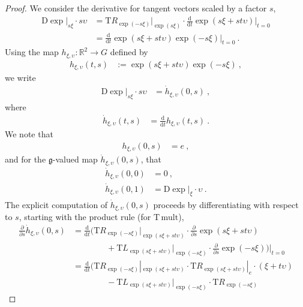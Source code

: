 \documentclass[10pt,a4paper]{article}
\theoremstyle{mytheorem}
\theoremstyle{mydefinition}
\newcommand{\dt}{\mathrm{d}}
\newcommand{\Dt}{\mathrm{D}}
\newcommand{\Tt}{\mathrm{T}}
\newcommand{\fg}{\mathfrak{g}}
\begin{document}
\begin{proof}
We consider the derivative for tangent vectors scaled by a factor $s$,
\begin{align*}
	\Dt\exp|_{s\xi} \cdot s\upsilon
	&=
	\Tt R_{\exp(-s\xi)}|_{\exp(s\xi)}
	\cdot
	\frac{\dt}{\dt t}
		\exp(s\xi + st\upsilon)
	\Big|_{t=0}
	\nonumber\\
	&=
	\frac{\dt}{\dt t}
		\exp(s\xi + st\upsilon)
		\exp(-s\xi)
	\Big|_{t=0}
	\ .
\end{align*}
Using the map $h_{\xi,\upsilon}:\mathbb{R}^2\rightarrow G$ defined by
\begin{align*}
	h_{\xi,\upsilon}(t, s)
	&:= 
	\exp(s\xi + st\upsilon)\exp(-s\xi)
	\ ,
\end{align*}
we write
\begin{align*}
	\Dt\exp|_{s\xi} \cdot s\upsilon
	&= \dot{h}_{\xi, \upsilon}(0, s)
	\ ,
\end{align*}
where
\begin{align*}
	\dot{h}_{\xi, \upsilon}(t, s)
	&= \frac{\dt}{\dt t} h_{\xi, \upsilon}(t, s)
	\ .
\end{align*}
We note that
\begin{align*}
	h_{\xi,\upsilon}(0, s)
	&= e
	\ ,
\end{align*}
and for the $\fg$-valued map $\dot{h}_{\xi, \upsilon}(0, s)$, that
\begin{align*}
	\dot{h}_{\xi, \upsilon}(0, 0)
	&= 0
	\ ,\\
	\dot{h}_{\xi, \upsilon}(0, 1)
	&= \Dt\exp|_{\xi} \cdot \upsilon
	\ .
\end{align*}
The explicit computation of $\dot{h}_{\xi, \upsilon}(0, s)$ proceeds by differentiating with respect to $s$, starting with the product rule (for $\Tt\,\mathrm{mult}$),
\begin{align*}
	\frac{\partial}{\partial s}
	\dot{h}_{\xi, \upsilon}(0, s)	
	&=
	\frac{\dt}{\dt t}	
	\Big(
		\Tt R_{\exp(-s\xi)}
		|_{\exp(s\xi + st\upsilon)}
		\cdot	
		\frac{\partial}{\partial s}\exp(s\xi + st\upsilon)
	\nonumber\\
	&\qquad\qquad+
		\Tt L_{\exp(s\xi + st\upsilon)}
		|_{\exp(-s\xi)}		
		\cdot			
		\frac{\partial}{\partial s}
		\exp(-s\xi)
	\Big)	
	\Big|_{t=0}
	\nonumber\\	
	&=
	\frac{\dt}{\dt t}	
	\Big(
		\Tt R_{\exp(-s\xi)}
		|_{\exp(s\xi + st\upsilon)}
		\cdot	
		\Tt R_{\exp(s\xi + st\upsilon)}
		|_e
		\cdot
		(\xi + t\upsilon)
	\nonumber\\
	&\qquad\qquad-
		\Tt L_{\exp(s\xi + st\upsilon)}
		|_{\exp(-s\xi)}	
		\cdot
		\Tt R_{\exp(-s\xi)}

\end{align*}
\end{proof}
\end{document}
